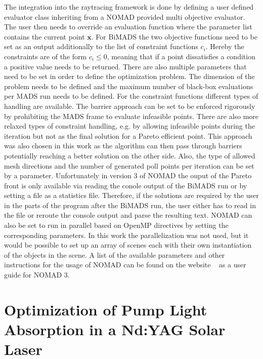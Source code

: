 \documentclass[a4paper,10pt]{article}
\renewcommand{\vec}[1]{\mathbf{#1}}
\begin{document}
    The integration into the raytracing framework is done by defining
    a user defined evaluator class inheriting from a NOMAD provided
    multi objective evaluator.
    The user then needs to override an evaluation function where the
    parameter list contains the current point $\vec{x}$.
    For BiMADS the two objective functions need to be set as an output
    additionally to the list of constraint functions $c_i$.
    Hereby the constraints are of the form $c_i \leq 0$, meaning that
    if a point dissatisfies a condition a positive value needs to be
    returned.       
    There are also multiple parameters that need to be set in order to
    define the optimization problem.
    The dimension of the problem needs to be defined and the maximum number
    of black-box evaluations per MADS run needs to be defined.
    For the constraint functions different types of handling are available.
    The barrier approach can be set to be enforced rigorously by 
    prohibiting the MADS frame to evaluate infeasible points.
    There are also more relaxed types of constraint handling, e.g. by allowing
    infeasible points during the iteration but not as the final solution
    for a Pareto efficient point.
    This approach was also chosen in this work as the algorithm can then pass
    through barriers potentially reaching a better solution on the other side.
    Also, the type of allowed mesh directions and the number of 
    generated poll points per iteration can be set by a parameter.
    Unfortunately in version 3 of NOMAD the ouput of the Pareto front
    is only available via reading the conole output of the BiMADS run
    or by setting a file as a statistics file.
    Therefore, if the solutions are required by the user in the
    parts of the program after the BiMADS run, the user either has to
    read in the file or reroute the console output and parse the resulting
    text.
    NOMAD can also be set to run in parallel based on OpenMP directives by
    setting the corresponding parameters.
    In this work the parallelization was not used, but it would be possible
    to set up an array of scenes each with their own instantiation of
    the objects in the scene.
    A list of the available parameters and other instructions for 
    the usage of NOMAD can be found on the website ~\cite{nomad_website} as
    a user guide for NOMAD 3.
    

    \newpage
    \section{Optimization of Pump Light Absorption in a Nd:YAG Solar Laser} \label{sec:setup}
    
\end{document}
